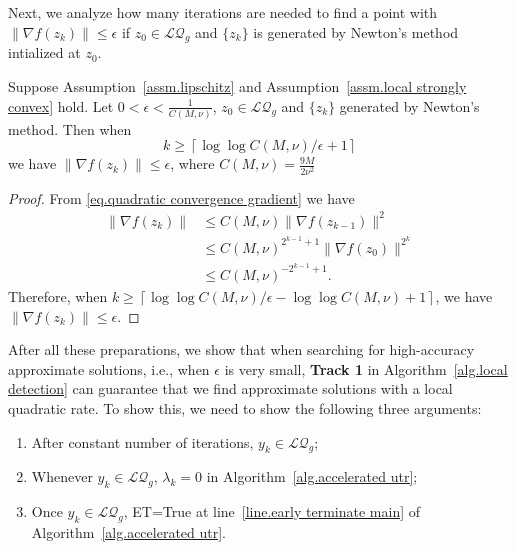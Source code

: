 \documentclass{mcom-l}
\numberwithin{equation}{section}
\begin{document}
Next, we analyze how many iterations are needed to find a point with $\|\nabla f(z_k)\|\leq \epsilon$ if $z_0 \in \mathcal{LQ}_g$ and $\{z_k\}$ is generated by Newton's method intialized at $z_0$.
\begin{corollary}
    \label{lem.number of iterations newton}
    Suppose Assumption~\ref{assm.lipschitz} and Assumption~\ref{assm.local strongly convex} hold. Let $0<\epsilon< \frac{1}{C(M,\nu)}$, $z_0\in\mathcal{LQ}_g$ and $\{z_k\}$ generated by Newton's method. Then when
    \begin{equation}
        \label{eq.number of iterations newton}
        k\geq \left\lceil\log\log C(M,\nu)/\epsilon+1\right\rceil
    \end{equation}
    we have $\|\nabla f(z_k)\|\leq \epsilon$, where $C(M,\nu) = \frac{9M}{2\nu^2}$
\end{corollary}
\begin{proof}
    From \eqref{eq.quadratic convergence gradient} we have
    \begin{equation*}
        \begin{aligned}
            \|\nabla f(z_k)\| & \leq C(M,\nu)\|\nabla f(z_{k-1})\|^2              \\
                              & \leq C(M,\nu)^{2^{k-1}+1} \|\nabla f(z_0)\|^{2^k} \\
                              & \leq C(M,\nu)^{-2^{k-1}+1}.
        \end{aligned}
    \end{equation*}
    Therefore, when $k\geq \left\lceil\log\log C(M,\nu)/\epsilon-\log\log C(M,\nu)+1\right\rceil$, we have $\|\nabla f(z_k)\|\leq \epsilon$.
\end{proof}
After all these preparations, we show that when searching for high-accuracy approximate solutions, i.e., when $\epsilon$ is very small, \textbf{Track 1} in Algorithm~\ref{alg.local detection} can guarantee that we find approximate solutions with a local quadratic rate. To show this, we need to show the following three arguments:
\begin{enumerate}
    \item After constant number of iterations, $y_k\in\mathcal{LQ}_g$;
    \item Whenever $y_k\in\mathcal{LQ}_g$, $\lambda_k=0$ in Algorithm~\ref{alg.accelerated utr};
    \item Once $y_k\in \mathcal{LQ}_g$, ET=True at line~\ref{line.early terminate main} of Algorithm~\ref{alg.accelerated utr}.
\end{enumerate}
\end{document}
